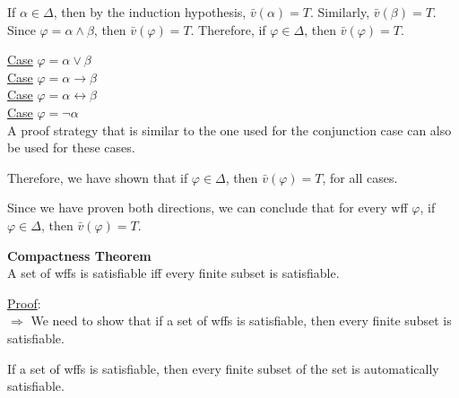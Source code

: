 \documentclass[12pt]{article}	%
\begin{document}
\begin{flushleft}
\vspace{2mm}

If $\alpha \in \Delta$, then by the induction hypothesis, $\bar{v}(\alpha) = T$. Similarly, $\bar{v}(\beta) = T$. Since $\varphi = \alpha \wedge \beta$, then $\bar{v}(\varphi) = T$. Therefore, if $\varphi \in \Delta$, then $\bar{v}(\varphi) = T$. \\

\vspace{2mm}

\underline{Case} $\varphi = \alpha \vee \beta$ \\
\underline{Case} $\varphi = \alpha \rightarrow \beta$ \\
\underline{Case} $\varphi = \alpha \leftrightarrow \beta$ \\
\underline{Case} $\varphi = \neg\alpha$ \\
A proof strategy that is similar to the one used for the conjunction case can also be used for these cases.

\vspace{2mm}

Therefore, we have shown that if $\varphi \in \Delta$, then $\bar{v}(\varphi) = T$, for all cases.

\vspace{2mm}

Since we have proven both directions, we can conclude that for every wff $\varphi$, if $\varphi \in \Delta$, then $\bar{v}(\varphi) = T$. \\

\vspace{10mm}

\textbf{Compactness Theorem} \\
A set of wffs is satisfiable iff every finite subset is satisfiable. \\

\vspace{5mm}

\underline{Proof}: \\
$\Rightarrow$ We need to show that if a set of wffs is satisfiable, then every finite subset is satisfiable. \\

\vspace{2mm}

If a set of wffs is satisfiable, then every finite subset of the set is automatically satisfiable. \\


\end{flushleft}
\end{document}
